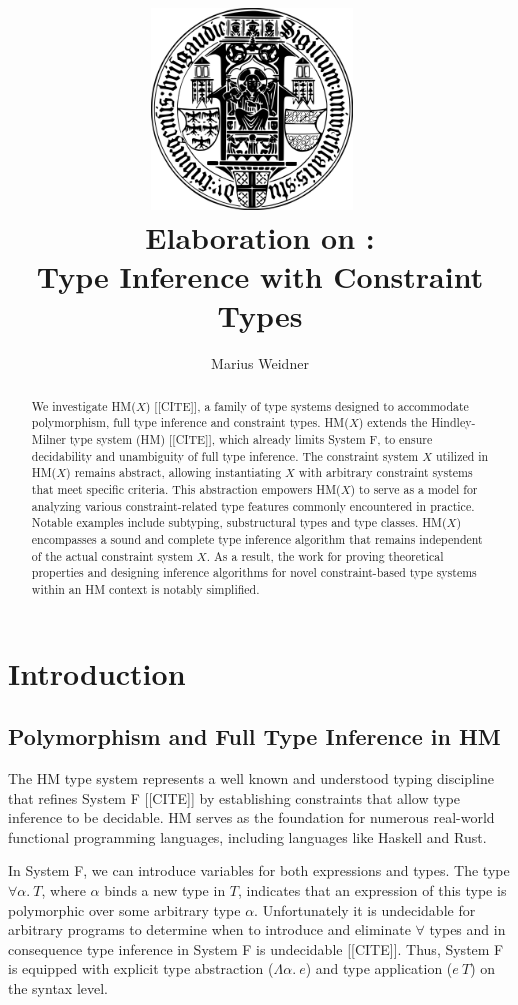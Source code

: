 \documentclass[runningheads]{llncs}
\title{\includegraphics[width=0.4\textwidth]{logo.png}~\\[1cm] Elaboration on
  \hmx:\\Type Inference with Constraint Types}
\institute{Chair of Programming Languages, University of Freiburg \\
  \email{weidner@cs.uni-freiburg.de}}
\author{Marius Weidner}
\newcommand{\hmx}{HM($X$)}
\begin{document}
\let\oldaddcontentsline\addcontentsline{}
\def\addcontentsline#1#2#3{}
\maketitle
\def\addcontentsline#1#2#3{\oldaddcontentsline{#1}{#2}{#3}}

\begin{abstract}
  We investigate \hmx{} [[CITE]], a family of type systems designed to
  accommodate
  polymorphism, full type inference and constraint types.
  \hmx{} extends the Hindley-Milner type system (HM) [[CITE]], which already
  limits
  System F, to ensure decidability and unambiguity of full type inference.
  The constraint system $X$ utilized in \hmx{} remains abstract, allowing
  instantiating $X$ with arbitrary constraint systems that meet specific
  criteria.
  This abstraction empowers \hmx{} to serve as a model for analyzing various
  constraint-related type features commonly encountered in practice.
  Notable examples include subtyping, substructural
  types and type classes.
  \hmx{} encompasses a sound and complete type inference algorithm that remains
  independent of the actual constraint system
  $X$.
  As a result, the work for proving theoretical properties and designing
  inference algorithms for novel constraint-based type systems within an
  HM context is notably simplified.
\end{abstract}

\setcounter{tocdepth}{2}
\tableofcontents
\newpage

\section{Introduction}

\subsection{Polymorphism and Full Type Inference in HM}
The HM type system represents a well known and understood typing discipline
that
refines System F [[CITE]] by establishing constraints that allow type inference
to be decidable.
HM serves as the foundation for numerous real-world functional programming
languages, including languages like Haskell and Rust.

In System F, we can introduce variables for both expressions and types.
The type $∀α. \ T$, where $α$ binds a new type in $T$,
indicates that an expression of this type is polymorphic over some
arbitrary type $α$.
Unfortunately it is undecidable for arbitrary programs to determine when to
introduce and eliminate $∀$ types and in consequence type inference in System F
is undecidable [[CITE]].
Thus, System F is equipped with explicit type abstraction ($Λα. \ e$)
and type
application ($e \ T$) on the syntax level.
\end{document}
